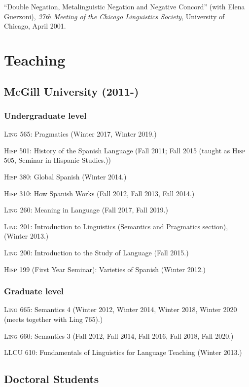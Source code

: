 \documentclass[11pt]{article}
\begin{document}
``Double Negation, Metalinguistic Negation and Negative
Concord'' (with Elena Guerzoni), \textit{37th Meeting of the Chicago
  Linguistics Society}, University of Chicago, April 2001. 

\section*{Teaching}

\subsection*{McGill University (2011-)}

\subsubsection*{Undergraduate level}

\textsc{Ling} 565: Pragmatics (Winter 2017, Winter 2019.)

\textsc{Hisp} 501: History of the Spanish Language (Fall 2011; Fall 2015 (taught as \textsc{Hisp} 505, Seminar in Hispanic Studies.))

\textsc{Hisp} 380: Global Spanish (Winter 2014.)

\textsc{Hisp} 310: How Spanish Works (Fall 2012, Fall 2013, Fall 2014.)

\textsc{Ling} 260: Meaning in Language (Fall 2017, Fall 2019.)

\textsc{Ling} 201: Introduction to Linguistics (Semantics and Pragmatics
section), (Winter 2013.)

\textsc{Ling} 200: Introduction to the Study of Language (Fall 2015.)

\textsc{Hisp} 199 (First Year Seminar): Varieties of Spanish (Winter 2012.)

\subsubsection*{Graduate level}

\textsc{Ling} 665: Semantics 4 (Winter 2012, Winter 2014, Winter 2018, Winter 2020 (meets together with
Ling 765).)

\textsc{Ling} 660: Semantics 3 (Fall 2012, Fall 2014, Fall 2016, Fall 2018, Fall 2020.)

LLCU 610: Fundamentals of Linguistics for Language Teaching (Winter 2013.)


\subsection*{Doctoral Students}
\end{document}
